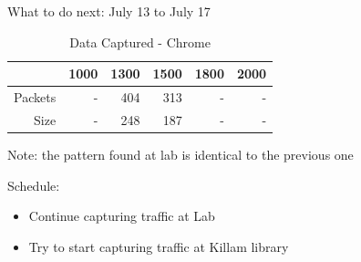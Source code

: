 \documentclass{beamer}
\begin{document}
\begin{frame}{What to do next: July 13 to July 17}
  \begin{table}[htbp]
    \centering
    \caption{Data Captured - Chrome}
    \begin{tabular}{rrrrrr}
      \toprule
              & 1000 & 1300 & 1500 & 1800 & 2000 \\
      \midrule
      Packets & -    & 404  & 313  & -    & -    \\
      Size    & -    & 248  & 187  & -    & -    \\
      \bottomrule
    \end{tabular}
  \end{table}

  Note: the pattern found at lab is identical to the previous one

  \vspace{20px}

  Schedule:
  \begin{itemize}
    \item Continue capturing traffic at Lab
    \item Try to start capturing traffic at Killam library
  \end{itemize}

\end{frame}
\end{document}

